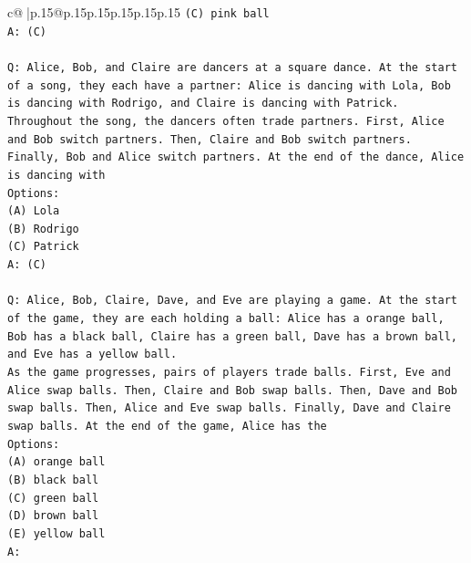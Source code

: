 \documentclass{article}
\begin{document}
{\begin{supertabular}{c@{$\;$}|p{.15\linewidth}@{}p{.15\linewidth}p{.15\linewidth}p{.15\linewidth}p{.15\linewidth}p{.15\linewidth}}
{{{\texttt{(C) pink ball} \\
\texttt{A: (C)} \\
\\ 
\texttt{Q: Alice, Bob, and Claire are dancers at a square dance. At the start of a song, they each have a partner: Alice is dancing with Lola, Bob is dancing with Rodrigo, and Claire is dancing with Patrick.} \\
\texttt{Throughout the song, the dancers often trade partners. First, Alice and Bob switch partners. Then, Claire and Bob switch partners. Finally, Bob and Alice switch partners. At the end of the dance, Alice is dancing with} \\
\texttt{Options:} \\
\texttt{(A) Lola} \\
\texttt{(B) Rodrigo} \\
\texttt{(C) Patrick} \\
\texttt{A: (C)} \\
\\ 
\texttt{Q: Alice, Bob, Claire, Dave, and Eve are playing a game. At the start of the game, they are each holding a ball: Alice has a orange ball, Bob has a black ball, Claire has a green ball, Dave has a brown ball, and Eve has a yellow ball.} \\
\texttt{As the game progresses, pairs of players trade balls. First, Eve and Alice swap balls. Then, Claire and Bob swap balls. Then, Dave and Bob swap balls. Then, Alice and Eve swap balls. Finally, Dave and Claire swap balls. At the end of the game, Alice has the} \\
\texttt{Options:} \\
\texttt{(A) orange ball} \\
\texttt{(B) black ball} \\
\texttt{(C) green ball} \\
\texttt{(D) brown ball} \\
\texttt{(E) yellow ball} \\
\texttt{A:} \\
            }
        }
    }
     \\ \\


\end{supertabular}}
\end{document}
